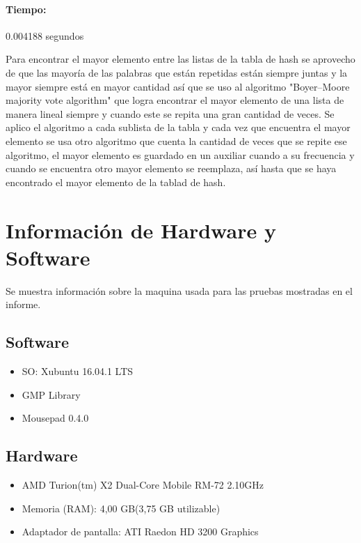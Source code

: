 \documentclass[12pt,letterpaper]{scrartcl}
\begin{document}
\paragraph{Tiempo:} 0.004188 segundos

Para encontrar el mayor elemento entre las listas de la tabla de hash se aprovecho de que las mayoría de las palabras que están repetidas están siempre juntas y la mayor siempre está en mayor cantidad así que se uso al algoritmo "Boyer–Moore majority vote algorithm" que logra encontrar el mayor elemento de una lista de manera lineal siempre y cuando este se repita una gran cantidad de veces. Se aplico el algoritmo a cada sublista de la tabla y cada vez que encuentra el mayor elemento se usa otro algoritmo que cuenta la cantidad de veces que se repite ese algoritmo, el mayor elemento es guardado en un auxiliar cuando a su frecuencia y cuando se encuentra otro mayor elemento se reemplaza, así hasta que se haya encontrado el mayor elemento de la tablad de hash.

\newpage
\section{Información de Hardware y Software}

Se muestra información sobre la maquina usada para las pruebas mostradas en el informe.

\subsection{Software}
\begin{itemize}
\item SO: Xubuntu 16.04.1 LTS
\item GMP Library
\item Mousepad 0.4.0
\end{itemize}

\subsection{Hardware}
\begin{itemize}
\item AMD Turion(tm) X2 Dual-Core Mobile RM-72 2.10GHz
\item Memoria (RAM): 4,00 GB(3,75 GB utilizable)
\item Adaptador de pantalla: ATI Raedon HD 3200 Graphics
\end{itemize}

\newpage
\end{document}
